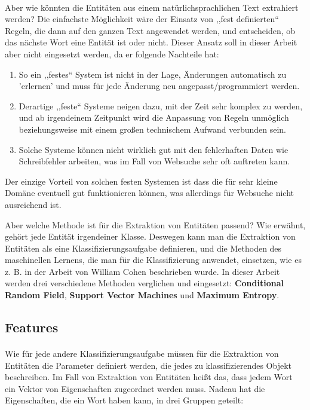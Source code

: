 \paragraph{}
Aber wie könnten die Entitäten aus einem natürlichsprachlichen Text extrahiert werden? Die einfachste Möglichkeit wäre der Einsatz von ,,fest definierten`` Regeln, die dann auf den ganzen Text angewendet werden, und entscheiden, ob das nächste Wort eine Entität ist oder nicht. Dieser Ansatz soll in dieser Arbeit aber nicht eingesetzt werden, da er folgende Nachteile\cite{baluja2000applying} hat:
\begin{enumerate}
\item So ein ,,festes`` System ist nicht in der Lage, Änderungen automatisch zu 'erlernen' und muss für jede Änderung neu angepasst/programmiert werden.
\item Derartige ,,feste`` Systeme neigen dazu, mit der Zeit sehr komplex zu werden, und ab irgendeinem Zeitpunkt wird die Anpassung von Regeln unmöglich beziehungsweise mit einem großen technischem Aufwand verbunden sein.
\item Solche Systeme können nicht wirklich gut mit den fehlerhaften Daten wie Schreibfehler arbeiten, was im Fall von Websuche sehr oft auftreten kann.
\end{enumerate}  
Der einzige Vorteil von solchen festen Systemen ist dass die für sehr kleine Domäne eventuell gut funktionieren können, was allerdings für Websuche nicht ausreichend ist.

Aber welche Methode ist für die Extraktion von Entitäten passend? Wie erwähnt, gehört jede Entität irgendeiner Klasse. Deswegen kann man die Extraktion von Entitäten als eine Klassifizierungsaufgabe definieren, und die Methoden des maschinellen Lernens, die man für die Klassifizierung anwendet, einsetzen, wie es z. B. in der Arbeit von William Cohen\cite{cohen2004exploiting} beschrieben wurde. In dieser Arbeit werden drei verschiedene Methoden verglichen und eingesetzt: \textbf{Conditional Random Field}, \textbf{Support Vector Machines} und \textbf{Maximum Entropy}.

\subsection{Features}
\paragraph{}
Wie für jede andere Klassifizierungsaufgabe müssen für die Extraktion von Entitäten die Parameter definiert werden, die jedes zu klassifizierendes Objekt beschreiben. Im Fall von Extraktion von Entitäten  heißt das, dass jedem Wort ein Vektor von Eigenschaften zugeordnet werden muss. Nadeau\cite{nadeau2007survey} hat die Eigenschaften, die ein Wort haben kann, in drei Gruppen geteilt:

